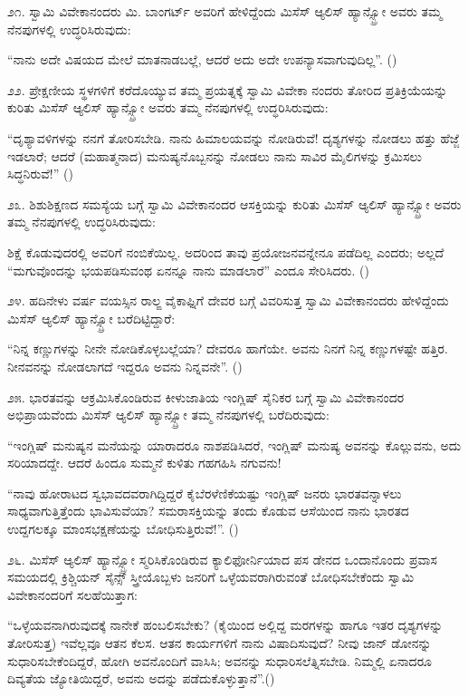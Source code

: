೨೧. ಸ್ವಾಮಿ ವಿವೇಕಾನಂದರು ಮಿ. ಬಾಂಗರ್ಟ್ ಅವರಿಗೆ ಹೇಳಿದ್ದೆಂದು ಮಿಸೆಸ್ ಆ್ಯಲಿಸ್ ಹ್ಯಾನ್ಸ್ಬ್ರೋ ಅವರು ತಮ್ಮ ನೆನಪುಗಳಲ್ಲಿ ಉದ್ಧರಿಸಿರುವುದು:

“ನಾನು ಅದೇ ವಿಷಯದ ಮೇಲೆ ಮಾತನಾಡಬಲ್ಲೆ, ಆದರೆ ಅದು ಅದೇ ಉಪನ್ಯಾಸವಾಗುವುದಿಲ್ಲ”. ()

೨೨. ಪ್ರೇಕ್ಷಣೀಯ ಸ್ಥಳಗಳಿಗೆ ಕರೆದೊಯ್ಯುವ ತಮ್ಮ ಪ್ರಯತ್ನಕ್ಕೆ ಸ್ವಾಮಿ ವಿವೇಕಾ ನಂದರು ತೋರಿದ ಪ್ರತಿಕ್ರಿಯೆಯನ್ನು ಕುರಿತು ಮಿಸೆಸ್ ಆ್ಯಲಿಸ್ ಹ್ಯಾನ್ಸ್ಬ್ರೋ ಅವರು ತಮ್ಮ ನೆನಪುಗಳಲ್ಲಿ ಉದ್ಧರಿಸಿರುವುದು:

“ದೃಶ್ಯಾವಳಿಗಳನ್ನು ನನಗೆ ತೋರಿಸಬೇಡಿ. ನಾನು ಹಿಮಾಲಯವನ್ನು ನೋಡಿರುವೆ! ದೃಶ್ಯಗಳನ್ನು ನೋಡಲು ಹತ್ತು ಹೆಜ್ಜೆ ಇಡಲಾರೆ; ಆದರೆ (ಮಹಾತ್ಮನಾದ) ಮನುಷ್ಯನೊಬ್ಬನನ್ನು ನೋಡಲು ನಾನು ಸಾವಿರ ಮೈಲಿಗಳನ್ನು ಕ್ರಮಿಸಲು ಸಿದ್ಧನಿರುವೆ!” ()

೨೩. ಶಿಶುಶಿಕ್ಷಣದ ಸಮಸ್ಯೆಯ ಬಗ್ಗೆ ಸ್ವಾಮಿ ವಿವೇಕಾನಂದರ ಆಸಕ್ತಿಯನ್ನು ಕುರಿತು ಮಿಸೆಸ್ ಆ್ಯಲಿಸ್ ಹ್ಯಾನ್ಸ್ಬ್ರೋ ಅವರು ತಮ್ಮ ನೆನಪುಗಳಲ್ಲಿ ಉದ್ಧರಿಸಿರುವುದು:

ಶಿಕ್ಷೆ ಕೊಡುವುದರಲ್ಲಿ ಅವರಿಗೆ ನಂಬಿಕೆಯಿಲ್ಲ. ಅದರಿಂದ ತಾವು ಪ್ರಯೋಜನವನ್ನೇನೂ ಪಡೆದಿಲ್ಲ ಎಂದರು; ಅಲ್ಲದೆ “ಮಗುವೊಂದನ್ನು ಭಯಪಡಿಸುವಂಥ ಏನನ್ನೂ ನಾನು ಮಾಡಲಾರೆ” ಎಂದೂ ಸೇರಿಸಿದರು. ()

೨೪. ಹದಿನೇಳು ವರ್ಷ ವಯಸ್ಸಿನ ರಾಲ್ಙ ವೈಕಾಫ್ನಿಗೆ ದೇವರ ಬಗ್ಗೆ ವಿವರಿಸುತ್ತ ಸ್ವಾಮಿ ವಿವೇಕಾನಂದರು ಹೇಳಿದ್ದೆಂದು ಮಿಸೆಸ್ ಆ್ಯಲಿಸ್ ಹ್ಯಾನ್ಸ್ಬ್ರೋ ಬರೆದಿಟ್ಟಿದ್ದಾರೆ:

“ನಿನ್ನ ಕಣ್ಣುಗಳನ್ನು ನೀನೇ ನೋಡಿಕೊಳ್ಳಬಲ್ಲೆಯಾ? ದೇವರೂ ಹಾಗೆಯೇ. ಅವನು ನಿನಗೆ ನಿನ್ನ ಕಣ್ಣುಗಳಷ್ಟೇ ಹತ್ತಿರ. ನೀನವನನ್ನು ನೋಡಲಾಗದೆ ಇದ್ದರೂ ಅವನು ನಿನ್ನವನೇ”. ()

೨೫. ಭಾರತವನ್ನು ಆಕ್ರಮಿಸಿಕೊಂಡಿರುವ ಕೀಳುಜಾತಿಯ ಇಂಗ್ಲಿಷ್ ಸೈನಿಕರ ಬಗ್ಗೆ ಸ್ವಾಮಿ ವಿವೇಕಾನಂದರ ಅಭಿಪ್ರಾಯವೆಂದು ಮಿಸೆಸ್ ಆ್ಯಲಿಸ್ ಹ್ಯಾನ್ಸ್ಬ್ರೋ ತಮ್ಮ ನೆನಪುಗಳಲ್ಲಿ ಬರೆದಿರುವುದು:

“ಇಂಗ್ಲಿಷ್ ಮನುಷ್ಯನ ಮನೆಯನ್ನು ಯಾರಾದರೂ ನಾಶಪಡಿಸಿದರೆ, ಇಂಗ್ಲಿಷ್ ಮನುಷ್ಯ ಅವನನ್ನು ಕೊಲ್ಲುವನು, ಅದು ಸರಿಯಾದದ್ದೇ. ಆದರೆ ಹಿಂದೂ ಸುಮ್ಮನೆ ಕುಳಿತು ಗಹಗಹಿಸಿ ನಗುವನು!

“ನಾವು ಹೋರಾಟದ ಸ್ವಭಾವದವರಾಗಿದ್ದಿದ್ದರೆ ಕೈಬೆರಳೆಣಿಕೆಯಷ್ಟು ಇಂಗ್ಲಿಷ್ ಜನರು ಭಾರತವನ್ನಾಳಲು ಸಾಧ್ಯವಾಗುತ್ತಿತ್ತೆಂದು ಭಾವಿಸುವೆಯಾ? ಸಮರಾಸಕ್ತಿಯನ್ನು ತಂದು ಕೊಡುವ ಆಸೆಯಿಂದ ನಾನು ಭಾರತದ ಉದ್ದಗಲಕ್ಕೂ ಮಾಂಸಭಕ್ಷಣೆಯನ್ನು ಬೋಧಿಸುತ್ತಿರುವೆ!”. ()

೨೬. ಮಿಸೆಸ್ ಆ್ಯಲಿಸ್ ಹ್ಯಾನ್ಸ್ಬ್ರೋ ಸ್ಮರಿಸಿಕೊಂಡಿರುವ ಕ್ಯಾಲಿಫೋರ್ನಿಯಾದ ಪಸ ಡೇನದ ಒಂದಾನೊಂದು ಪ್ರವಾಸ ಸಮಯದಲ್ಲಿ ಕ್ರಿಶ್ಚಿಯನ್ ಸೈನ್ಸ್ ಸ್ತ್ರೀಯೊಬ್ಬಳು ಜನರಿಗೆ ಒಳ್ಳೆಯವರಾಗಿರುವಂತೆ ಬೋಧಿಸಬೇಕೆಂದು ಸ್ವಾಮಿ ವಿವೇಕಾನಂದರಿಗೆ ಸಲಹೆಯಿತ್ತಾಗ:

“ಒಳ್ಳೆಯವನಾಗಿರುವುದಕ್ಕೆ ನಾನೇಕೆ ಹಂಬಲಿಸಬೇಕು? (ಕೈಯಿಂದ ಅಲ್ಲಿದ್ದ ಮರಗಳನ್ನು ಹಾಗೂ ಇತರ ದೃಶ್ಯಗಳನ್ನು ತೋರಿಸುತ್ತ) ಇವೆಲ್ಲವೂ ಆತನ ಕೆಲಸ. ಆತನ ಕಾರ್ಯಗಳಿಗೆ ನಾನು ವಿಷಾದಿಸುವುದೆ? ನೀವು ಜಾನ್ ಡೋನನ್ನು ಸುಧಾರಿಸಬೇಕೆಂದಿದ್ದರೆ, ಹೋಗಿ ಅವನೊಂದಿಗೆ ವಾಸಿಸಿ; ಅವನನ್ನು ಸುಧಾರಿಸಲೆತ್ನಿಸಬೇಡಿ. ನಿಮ್ಮಲ್ಲಿ ಏನಾದರೂ ದಿವ್ಯತೆಯ ಜ್ಯೋತಿಯಿದ್ದರೆ, ಅವನು ಅದನ್ನು ಪಡೆದುಕೊಳ್ಳುತ್ತಾನೆ”.()

